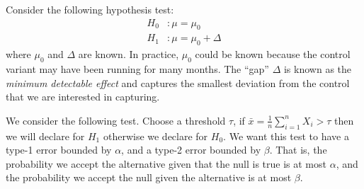 \documentclass[11pt]{article}
\newcommand{\1}[1]{\mathbf{1}\left\{#1\right\}}
\begin{document}

Consider the following hypothesis test:
\begin{align*}
    H_ 0&: \mu = \mu_0\\
    H_1&: \mu = \mu_0 +\Delta
\end{align*}
where $\mu_0$ and $\Delta$ are known. In practice, $\mu_0$ could be known because the control variant may have been running for many months. The ``gap'' $\Delta$ is known as the \textit{minimum detectable effect} and captures the smallest deviation from the control that we are interested in capturing.

We consider the following test. Choose a threshold $\tau$, if $\bar{x} = \frac{1}{n}\sum_{i=1}^n X_i > \tau$ then we will declare for $H_1$ otherwise we declare for $H_0$. We want this test to have a type-1 error bounded by $\alpha$, and a type-2 error bounded by $\beta$. That is, the probability we accept the alternative given that the null is true is at most $\alpha$, and the probability we accept the null given the alternative is at most $\beta$.
\end{document}
